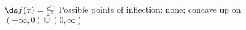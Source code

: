 {$\ds f(x) = \frac{e^x}{x^2}$
}
{Possible points of inflection: none;
concave up on $(-\infty,0)\cup(0,\infty)$
}

